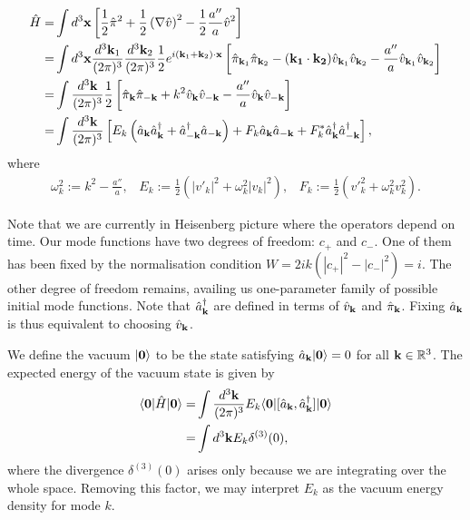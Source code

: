 \begin{align}
	\hat{H} =& \int d^3 \mathbf{x} \left[ \frac{1}{2} \hat{\pi}^2 + \frac{1}{2} \left( \nabla \hat{v} \right)^2 - \frac{1}{2}\frac{a''}{a} \hat{v}^2 \right] \label{eqn:single_field_inflation_simple_hammiltonian}\\
	=& \int d^3 \mathbf{x} \frac{d^3 \mathbf{k}_1}{(2\pi)^3} \frac{d^3 \mathbf{k}_2}{(2\pi)^3} \frac{1}{2} e^{i(\mathbf{k}_1 + \mathbf{k}_2) \cdot \mathbf{x}}  \left[ \hat{\pi}_{\mathbf{k}_1} \hat{\pi}_{\mathbf{k}_2} - (\mathbf{k_1} \cdot \mathbf{k_2}) \hat{v}_{\mathbf{k}_1} \hat{v}_{\mathbf{k}_2} - \frac{a''}{a} \hat{v}_{\mathbf{k}_1} \hat{v}_{\mathbf{k}_2} \right] \\
	=& \int \frac{d^3 \mathbf{k}}{(2\pi)^3}  \frac{1}{2} \left[ \hat{\pi}_{\mathbf{k}} \hat{\pi}_{-\mathbf{k}} + k^2 \hat{v}_{\mathbf{k}} \hat{v}_{-\mathbf{k}} - \frac{a''}{a} \hat{v}_{\mathbf{k}} \hat{v}_{-\mathbf{k}} \right] \\
	=&  \int \frac{d^3 \mathbf{k}}{(2\pi)^3} \left[ E_k \left( \hat{a}_\mathbf{k} \hat{a}^\dagger_\mathbf{k} + \hat{a}^\dagger_{-\mathbf{k}} \hat{a}_{-\mathbf{k}} \right) + F_k \hat{a}_{\mathbf{k}} \hat{a}_{-\mathbf{k}} + F_k^* \hat{a}^\dagger_{\mathbf{k}} \hat{a}^\dagger_{-\mathbf{k}}  \right],
\end{align}
where
\begin{align}
	\omega_k^2 := k^2 - \frac{a''}{a}, \;\;\; E_k := \frac{1}{2}(|v'_k|^2 + \omega_k^2 |v_k|^2), \;\;\; F_k := \frac{1}{2}(v'^2_k + \omega_k^2 v^2_k).
\end{align}

Note that we are currently in Heisenberg picture where the operators depend on time. Our mode functions have two degrees of freedom: $c_+$ and $c_-$. One of them has been fixed by the normalisation condition $W=2ik(|c_+|^2-|c_-|^2)=i$. The other degree of freedom remains, availing us one-parameter family of possible initial mode functions. Note that $\hat{a}^\dagger_\mathbf{k}$ are defined in terms of $\hat{v}_\mathbf{k}$ and $\hat{\pi}_\mathbf{k}$. Fixing $\hat{a}_\mathbf{k}$ is thus equivalent to choosing $\hat{v}_\mathbf{k}$.

We define the vacuum $|\mathbf{0}\rangle$ to be the state satisfying $\hat{a}_\mathbf{k} |\mathbf{0}\rangle = 0$ for all $\mathbf{k} \in \mathbb{R}^3$. The expected energy of the vacuum state is given by
\begin{align}
	\langle \mathbf{0} | \hat{H} | \mathbf{0} \rangle =& \int \frac{d^3\mathbf{k}}{(2\pi)^3} E_k \langle \mathbf{0} | [ \hat{a}_\mathbf{k}, \hat{a}^\dagger_\mathbf{k} ] | \mathbf{0} \rangle	\\
	=& \int d^3\mathbf{k} E_k \delta^{(3)}(0),
\end{align}
where the divergence $\delta^{(3)}(0)$ arises only because we are integrating over the whole space. Removing this factor, we may interpret $E_k$ as the vacuum energy density for mode $k$.

